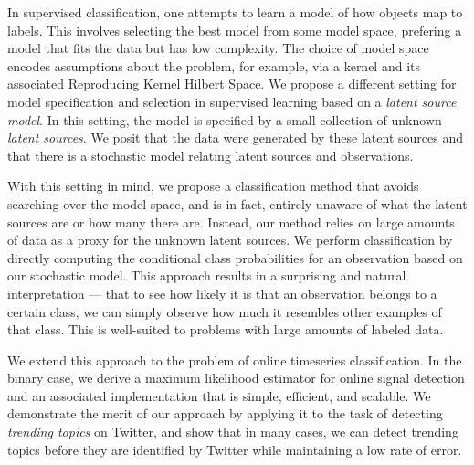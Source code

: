 
In supervised classification, one attempts to learn a model of how objects map
to labels. This involves selecting the best model from some model space,
prefering a model that fits the data but has low complexity. The choice of model
space encodes assumptions about the problem, for example, via a kernel and its
associated Reproducing Kernel Hilbert Space. We propose a different setting for
model specification and selection in supervised learning based on a {\em latent
  source model}. In this setting, the model is specified by a small collection
of unknown {\em latent sources}. We posit that the data were generated by these
latent sources and that there is a stochastic model relating latent sources and
observations.

With this setting in mind, we propose a classification method that avoids
searching over the model space, and is in fact, entirely unaware of what the
latent sources are or how many there are. Instead, our method relies on large
amounts of data as a proxy for the unknown latent sources. We perform
classification by directly computing the conditional class probabilities for an
observation based on our stochastic model. This approach results in a surprising
and natural interpretation --- that to see how likely it is that an observation
belongs to a certain class, we can simply observe how much it resembles other
examples of that class. This is well-suited to problems with large amounts of
labeled data.

We extend this approach to the problem of online timeseries classification. In
the binary case, we derive a maximum likelihood estimator for online signal
detection and an associated implementation that is simple, efficient, and
scalable. We demonstrate the merit of our approach by applying it to the task of
detecting {\em trending topics} on Twitter, and show that in many cases, we can
detect trending topics before they are identified by Twitter while maintaining a
low rate of error.



